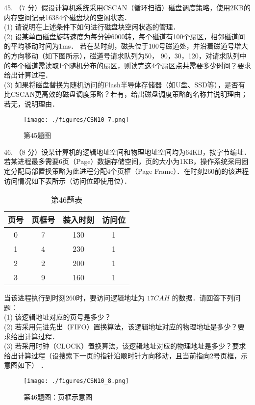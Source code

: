 45. （7 分）假设计算机系统采用CSCAN（循环扫描）磁盘调度策略，使用2KB的内存空间记录16384个磁盘块的空闲状态． \\
(1) 请说明在上述条件下如何进行磁盘块空闲状态的管理． \\
(2) 设某单面磁盘旋转速度为每分钟6000转，每个磁道有100个扇区，相邻磁道间的平均移动时间为1ms．
若在某时刻，磁头位于100号磁道处，并沿着磁道号增大的方向移动（如下图所示），磁道号请求队列为50，
90，30，120，对请求队列中的每个磁道需读取1个随机分布的扇区，则读完这4个扇区点共需要多少时间？要求给出计算过程． \\
(3) 如果将磁盘替换为随机访问的Flash半导体存储器（如U盘、SSD等），是否有比CSCAN更高效的磁盘调度策略？若有，给出磁盘调度策略的名称并说明理由；若无，说明理由．
\begin{figure}[ht]
\centering
\texttt{[image: ./figures/CSN10\_7.png]}
\caption{第45题图} \label{CSN10_fig7}
\end{figure}

46. （8 分）设某计算机的逻辑地址空间和物理地址空间均为64KB，按字节编址．若某进程最多需要6页（Page）数据存储空间，页的大小为1KB，操作系统采用固定分配局部置换策略为此进程分配4个页框（Page Frame）．在时刻260前的该进程访问情况如下表所示（访问位即使用位）． \\
\begin{table}[ht]
\centering
\caption{第46题表}\label{CSN10_tab1}
\begin{tabular}{|c|c|c|c|}
\hline
页号 & 页框号 & 装入时刻 & 访问位 \\
\hline
0 & 7 & 130 & 1 \\
\hline
1 & 4 & 230 & 1 \\
\hline
2 & 2 & 200 & 1 \\
\hline
3 & 9 & 160 & 1 \\
\hline
\end{tabular}
\end{table}

当该进程执行到时刻260时，要访问逻辑地址为 $17CAH$ 的数据．请回答下列问题： \\
(1) 该逻辑地址对应的页号是多少？ \\
(2) 若采用先进先出（FIFO）置换算法，该逻辑地址对应的物理地址是多少？要求给出计算过程． \\
(3) 若采用时钟（CLOCK）置换算法，该逻辑地址对应的物理地址是多少？要求给出计算过程（设搜索下一页的指针沿顺时针方向移动，且当前指向2号页框，示意图如下） ．
\begin{figure}[ht]
\centering
\texttt{[image: ./figures/CSN10\_8.png]}
\caption{第46题图：页框示意图} \label{CSN10_fig8}
\end{figure}

